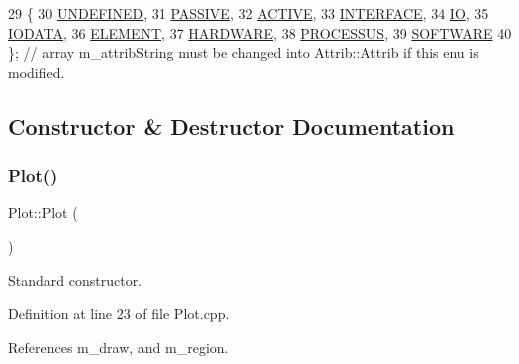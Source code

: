 \begin{DoxyCode}
29                 \{
30     \hyperlink{classAttrib_a69e171d7cc6417835a5a306d3c764235a3a8da2ab97dda18aebab196fe4100531}{UNDEFINED},
31     \hyperlink{classAttrib_a69e171d7cc6417835a5a306d3c764235a2bfb2af57b87031d190a05fe25dd92ed}{PASSIVE},
32     \hyperlink{classAttrib_a69e171d7cc6417835a5a306d3c764235a3b1fec929c0370d1436f2f06e298fb0d}{ACTIVE},
33     \hyperlink{classAttrib_a69e171d7cc6417835a5a306d3c764235aa27c16b480a369ea4d18b07b2516bbc7}{INTERFACE},
34     \hyperlink{classAttrib_a69e171d7cc6417835a5a306d3c764235a1420a5b8c0540b2af210b6975eded7f9}{IO},
35     \hyperlink{classAttrib_a69e171d7cc6417835a5a306d3c764235a0af3b0d0ac323c1704e6c69cf90add28}{IODATA},
36     \hyperlink{classAttrib_a69e171d7cc6417835a5a306d3c764235a7788bc5dd333fd8ce18562b269c9dab1}{ELEMENT},
37     \hyperlink{classAttrib_a69e171d7cc6417835a5a306d3c764235a61ceb22149f365f1780d18f9d1459423}{HARDWARE},
38     \hyperlink{classAttrib_a69e171d7cc6417835a5a306d3c764235a75250e29692496e73effca2c0330977f}{PROCESSUS},
39     \hyperlink{classAttrib_a69e171d7cc6417835a5a306d3c764235a103a67cd0b8f07ef478fa45d4356e27b}{SOFTWARE} 
40   \}; \textcolor{comment}{// array m\_attribString must be changed into Attrib::Attrib if this enu is modified. }
\end{DoxyCode}


\subsection{Constructor \& Destructor Documentation}
\mbox{\label{classPlot_ae8dca35f270d0964aac1e4ff42259129}} 
\subsubsection{\texorpdfstring{Plot()}{Plot()}\hspace{0.1cm}{\footnotesize\ttfamily [1/2]}}
{\footnotesize\ttfamily Plot\+::\+Plot (\begin{DoxyParamCaption}{ }\end{DoxyParamCaption})}



Standard constructor. 



Definition at line 23 of file Plot.\+cpp.



References m\+\_\+draw, and m\+\_\+region.


